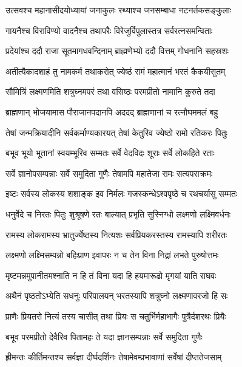 \twolineshloka
{उत्सवश्च महानासीदयोध्यायां जनाकुलः}
{रथ्याश्च जनसम्बाधा नटनर्तकसङ्कुलाः} %

\twolineshloka
{गायनैश्च विराविण्यो वादनैश्च तथापरैः}
{विरेजुर्विपुलास्तत्र सर्वरत्नसमन्विताः} %

\twolineshloka
{प्रदेयांश्च ददौ राजा सूतमागधवन्दिनाम्}
{ब्राह्मणेभ्यो ददौ वित्तम् गोधनानि सहस्रशः} %

\twolineshloka
{अतीत्यैकादशाहं तु नामकर्म तथाकरोत्}
{ज्येष्ठं रामं महात्मानं भरतं कैकयीसुतम्} %

\twolineshloka
{सौमित्रिं लक्ष्मणमिति शत्रुघ्नमपरं तथा}
{वसिष्ठः परमप्रीतो नामानि कुरुते तदा} %

\twolineshloka
{ब्राह्मणान् भोजयामास पौराजानपदानपि}
{अददद् ब्राह्मणानां च रत्नौघममलं बहु} %

\twolineshloka
{तेषां जन्मक्रियादीनि सर्वकर्माण्यकारयत्}
{तेषां केतुरिव ज्येष्ठो रामो रतिकरः पितुः} %

\twolineshloka
{बभूव भूयो भूतानां स्वयम्भूरिव सम्मतः}
{सर्वे वेदविदः शूराः सर्वे लोकहिते रताः} %

\twolineshloka
{सर्वे ज्ञानोपसम्पन्नाः सर्वे समुदिता गुणैः}
{तेषामपि महातेजा रामः सत्यपराक्रमः} %

\twolineshloka
{इष्टः सर्वस्य लोकस्य शशाङ्क इव निर्मलः}
{गजस्कन्धेऽश्वपृष्ठे च रथचर्यासु सम्मतः} %

\twolineshloka
{धनुर्वेदे च निरतः पितुः शुश्रूषणे रतः}
{बाल्यात् प्रभृति सुस्निग्धो लक्ष्मणो लक्ष्मिवर्धनः} %

\twolineshloka
{रामस्य लोकरामस्य भ्रातुर्ज्येष्ठस्य नित्यशः}
{सर्वप्रियकरस्तस्य रामस्यापि शरीरतः} %

\twolineshloka
{लक्ष्मणो लक्ष्मिसम्पन्नो बहिःप्राण इवापरः}
{न च तेन विना निद्रां लभते पुरुषोत्तमः} %

\twolineshloka
{मृष्टमन्नमुपानीतमश्नाति न हि तं विना}
{यदा हि हयमारूढो मृगयां याति राघवः} %

\twolineshloka
{अथैनं पृष्ठतोऽभ्येति सधनुः परिपालयन्}
{भरतस्यापि शत्रुघ्नो लक्ष्मणावरजो हि सः} %

\twolineshloka
{प्राणैः प्रियतरो नित्यं तस्य चासीत् तथा प्रियः}
{स चतुर्भिर्महाभागैः पुत्रैर्दशरथः प्रियैः} %

\twolineshloka
{बभूव परमप्रीतो देवैरिव पितामहः}
{ते यदा ज्ञानसम्पन्नाः सर्वे समुदिता गुणैः} %

\twolineshloka
{ह्रीमन्तः कीर्तिमन्तश्च सर्वज्ञा दीर्घदर्शिनः}
{तेषामेवम्प्रभावाणां सर्वेषां दीप्ततेजसाम्} %

